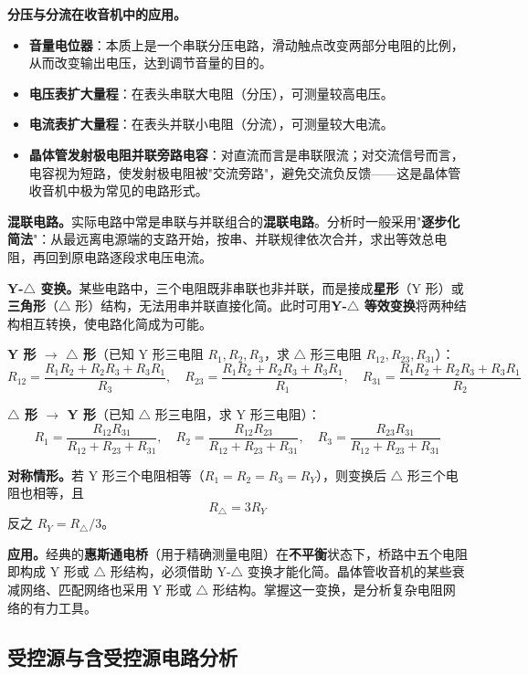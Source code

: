 \documentclass[12pt,UTF8]{ctexbook}
\begin{document}
\textbf{分压与分流在收音机中的应用。}
\begin{itemize}
  \item \textbf{音量电位器}：本质上是一个串联分压电路，滑动触点改变两部分电阻的比例，从而改变输出电压，达到调节音量的目的。
  \item \textbf{电压表扩大量程}：在表头串联大电阻（分压），可测量较高电压。
  \item \textbf{电流表扩大量程}：在表头并联小电阻（分流），可测量较大电流。
  \item \textbf{晶体管发射极电阻并联旁路电容}：对直流而言是串联限流；对交流信号而言，电容视为短路，使发射极电阻被"交流旁路"，避免交流负反馈——这是晶体管收音机中极为常见的电路形式。
\end{itemize}

\textbf{混联电路。}实际电路中常是串联与并联组合的\textbf{混联电路}。分析时一般采用"\textbf{逐步化简法}"：从最远离电源端的支路开始，按串、并联规律依次合并，求出等效总电阻，再回到原电路逐段求电压电流。

\textbf{Y-$\triangle$ 变换。}某些电路中，三个电阻既非串联也非并联，而是接成\textbf{星形}（Y 形）或\textbf{三角形}（$\triangle$ 形）结构，无法用串并联直接化简。此时可用\textbf{Y-$\triangle$ 等效变换}将两种结构相互转换，使电路化简成为可能。


\textbf{Y 形 $\to$ $\triangle$ 形}（已知 Y 形三电阻 $R_1, R_2, R_3$，求 $\triangle$ 形三电阻 $R_{12}, R_{23}, R_{31}$）：
\[
R_{12} = \frac{R_1 R_2 + R_2 R_3 + R_3 R_1}{R_3}, \quad
R_{23} = \frac{R_1 R_2 + R_2 R_3 + R_3 R_1}{R_1}, \quad
R_{31} = \frac{R_1 R_2 + R_2 R_3 + R_3 R_1}{R_2}
\]

\textbf{$\triangle$ 形 $\to$ Y 形}（已知 $\triangle$ 形三电阻，求 Y 形三电阻）：
\[
R_1 = \frac{R_{12} R_{31}}{R_{12} + R_{23} + R_{31}}, \quad
R_2 = \frac{R_{12} R_{23}}{R_{12} + R_{23} + R_{31}}, \quad
R_3 = \frac{R_{23} R_{31}}{R_{12} + R_{23} + R_{31}}
\]

\textbf{对称情形。}若 Y 形三个电阻相等（$R_1 = R_2 = R_3 = R_Y$），则变换后 $\triangle$ 形三个电阻也相等，且
\[
R_\triangle = 3 R_Y
\]
反之 $R_Y = R_\triangle / 3$。

\textbf{应用。}经典的\textbf{惠斯通电桥}（用于精确测量电阻）在\textbf{不平衡}状态下，桥路中五个电阻即构成 Y 形或 $\triangle$ 形结构，必须借助 Y-$\triangle$ 变换才能化简。晶体管收音机的某些衰减网络、匹配网络也采用 Y 形或 $\triangle$ 形结构。掌握这一变换，是分析复杂电阻网络的有力工具。

\subsection{受控源与含受控源电路分析}
\end{document}
